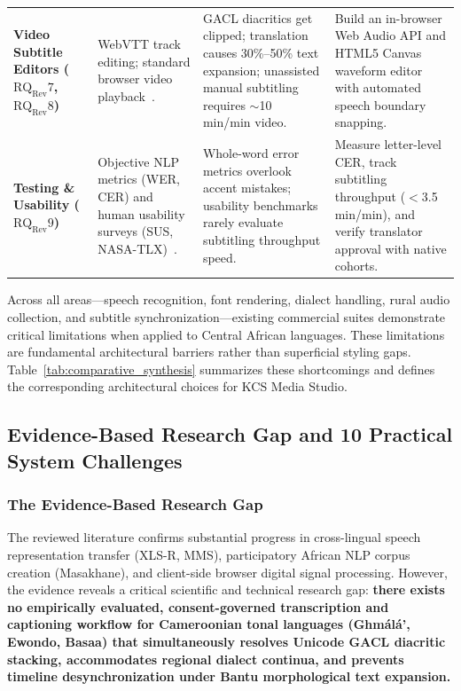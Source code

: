 \documentclass[a4paper,11pt]{article}
\begin{document}
\begin{table}[t]
\begin{tabular}{>{\raggedright\arraybackslash}p{2.8cm} >{\raggedright\arraybackslash}p{4.2cm} >{\raggedright\arraybackslash}p{4.6cm} >{\raggedright\arraybackslash}p{4.8cm}}
\addlinespace
\textbf{Video Subtitle Editors ($\text{RQ}_{\text{Rev}}7$, $\text{RQ}_{\text{Rev}}8$)} & WebVTT track editing; standard browser video playback~\cite{w3c2019webvtt, bigioi2023multilingual, won2025endtoend}. & GACL diacritics get clipped; translation causes 30\%--50\% text expansion; unassisted manual subtitling requires $\sim$10 min/min video. & Build an in-browser Web Audio API and HTML5 Canvas waveform editor with automated speech boundary snapping. \\
\addlinespace
\textbf{Testing \& Usability ($\text{RQ}_{\text{Rev}}9$)} & Objective NLP metrics (WER, CER) and human usability surveys (SUS, NASA-TLX)~\cite{brooke1996sus, hart1988nasa}. & Whole-word error metrics overlook accent mistakes; usability benchmarks rarely evaluate subtitling throughput speed. & Measure letter-level CER, track subtitling throughput ($<$3.5 min/min), and verify translator approval with native cohorts. \\
\bottomrule
\end{tabular}
\end{table}

Across all areas---speech recognition, font rendering, dialect handling, rural audio collection, and subtitle synchronization---existing commercial suites demonstrate critical limitations when applied to Central African languages. These limitations are fundamental architectural barriers rather than superficial styling gaps. Table~\ref{tab:comparative_synthesis} summarizes these shortcomings and defines the corresponding architectural choices for KCS Media Studio.

\subsection{Evidence-Based Research Gap and 10 Practical System Challenges}
\label{sec:chap2_gaps}

\subsubsection{The Evidence-Based Research Gap}
\label{sec:chap2_gap_def}
The reviewed literature confirms substantial progress in cross-lingual speech representation transfer (XLS-R, MMS), participatory African NLP corpus creation (Masakhane), and client-side browser digital signal processing. However, the evidence reveals a critical scientific and technical research gap: \textbf{there exists no empirically evaluated, consent-governed transcription and captioning workflow for Cameroonian tonal languages (Gh\textopeno m\'al\'a', Ewondo, Basaa) that simultaneously resolves Unicode GACL diacritic stacking, accommodates regional dialect continua, and prevents timeline desynchronization under Bantu morphological text expansion.}
\end{document}

